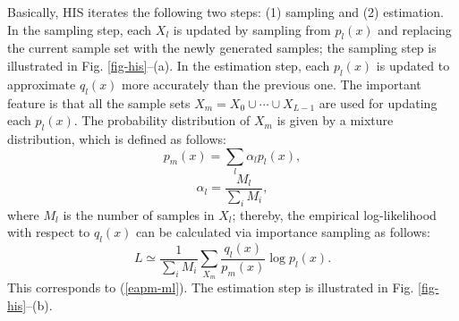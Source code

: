 Basically, HIS iterates the following two steps:
(1) sampling and (2) estimation.
In the sampling step,
each $X_l$ is updated
by sampling from $p_l(x)$
and replacing the current sample set with the newly generated samples;
the sampling step is illustrated in Fig. \ref{fig-his}--(a).
In the estimation step,
each $p_l(x)$ is updated
to approximate $q_l(x)$ more accurately than the previous one.
The important feature is that
all the sample sets $X_m=X_0 \cup \cdots \cup X_{L-1}$
are used for updating each $p_l(x)$.
The probability distribution of
$X_m$ is given by a mixture distribution,
which is defined as follows:
\begin{equation}
 p_m(x)=\sum_l \alpha_l p_l(x),
 \label{eq-mixture}
\end{equation}
\begin{equation}
 \alpha_l=\frac{M_l}{\sum_i M_i},
\end{equation}
where $M_l$ is the number of samples in $X_l$;
thereby, the empirical log-likelihood with respect to $q_l(x)$
can be calculated via importance sampling as follows:
\begin{equation}
 L \simeq
 \frac{1}{\sum_i M_i}\sum_{X_m} \frac{q_l(x)}{p_m(x)} \log p_l(x).
\label{mix-is}
\end{equation}
This corresponds to  (\ref{eapm-ml}).
The estimation step is illustrated in
Fig. \ref{fig-his}--(b).



